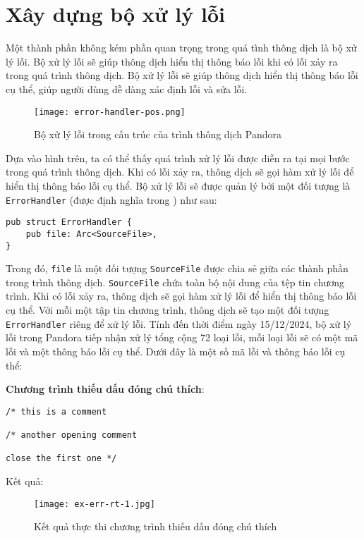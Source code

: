 \section{Xây dựng bộ xử lý lỗi}

    Một thành phần không kém phần quan trọng trong quá tình thông dịch là bộ xử lý lỗi. Bộ xử lý lỗi sẽ giúp thông dịch hiển thị thông báo lỗi khi có lỗi xảy ra trong quá trình thông dịch. Bộ xử lý lỗi sẽ giúp thông dịch hiển thị thông báo lỗi cụ thể, giúp người dùng dễ dàng xác định lỗi và sửa lỗi.

\begin{figure}[H]
    \centering
    \texttt{[image: error-handler-pos.png]}
    \caption{Bộ xử lý lỗi trong cấu trúc của trình thông dịch Pandora}
\end{figure}

Dựa vào hình trên, ta có thể thấy quá trình xử lý lỗi được diễn ra tại mọi bước trong quá trình thông dịch. Khi có lỗi xảy ra, thông dịch sẽ gọi hàm xử lý lỗi để hiển thị thông báo lỗi cụ thể. Bộ xử lý lỗi sẽ được quản lý bởi một đối tượng là \texttt{ErrorHandler} (được định nghĩa trong ) như sau:

\begin{lstlisting}[]
pub struct ErrorHandler {
    pub file: Arc<SourceFile>,
}
\end{lstlisting}

Trong đó, \texttt{file} là một đối tượng \texttt{SourceFile} được chia sẻ giữa các thành phần trong trình thông dịch. \texttt{SourceFile} chứa toàn bộ nội dung của tệp tin chương trình. Khi có lỗi xảy ra, thông dịch sẽ gọi hàm xử lý lỗi để hiển thị thông báo lỗi cụ thể. Với mỗi một tập tin chương trình, thông dịch sẽ tạo một đối tượng \texttt{ErrorHandler} riêng để xử lý lỗi. Tính đến thời điểm ngày 15/12/2024, bộ xử lý lỗi trong Pandora tiếp nhận xử lý tổng cộng 72 loại lỗi, mỗi loại lỗi sẽ có một mã lỗi và một thông báo lỗi cụ thể. Dưới đây là một số mã lỗi và thông báo lỗi cụ thể:

\noindent \textbf{Chương trình thiếu dấu đóng chú thích}:

\begin{lstlisting}[]
/* this is a comment

/* another opening comment

close the first one */
\end{lstlisting}

\noindent Kết quả:
\begin{figure}[H]
    \centering
    \texttt{[image: ex-err-rt-1.jpg]}
    \caption{Kết quả thực thi chương trình thiếu dấu đóng chú thích}
\end{figure}

